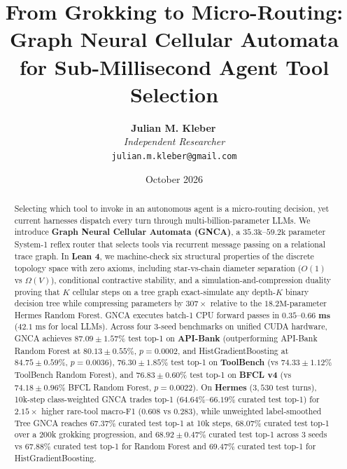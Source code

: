 \documentclass[10pt,twocolumn,letterpaper]{article}
\title{\textbf{From Grokking to Micro-Routing: Graph Neural Cellular Automata for Sub-Millisecond Agent Tool Selection}}
\author{%
  \textbf{Julian M. Kleber}\,\orcidlink{0000-0001-5518-0932} \\
  \textit{Independent Researcher} \\
  \texttt{julian.m.kleber@gmail.com}
}
\date{October 2026}
\begin{document}
\maketitle

\begin{abstract}
Selecting which tool to invoke in an autonomous agent is a micro-routing decision, yet current harnesses dispatch every turn through multi-billion-parameter LLMs. We introduce \textbf{Graph Neural Cellular Automata (GNCA)}, a $35.3\text{k}$--$59.2\text{k}$ parameter System-1 reflex router that selects tools via recurrent message passing on a relational trace graph. In \textbf{Lean 4}, we machine-check six structural properties of the discrete topology space with zero axioms, including star-vs-chain diameter separation ($O(1)$ vs $\Omega(V)$), conditional contractive stability, and a simulation-and-compression duality proving that $K$ cellular steps on a tree graph exact-simulate any depth-$K$ binary decision tree while compressing parameters by $307\times$ relative to the $18.2\text{M}$-parameter Hermes Random Forest. GNCA executes batch-1 CPU forward passes in $\mathbf{0.35}$--$\mathbf{0.66\text{ ms}}$ ($42.1\text{ ms}$ for local LLMs). Across four 3-seed benchmarks on unified CUDA hardware, GNCA achieves $\mathbf{87.09 \pm 1.57\%}$ test top-1 on \textbf{API-Bank} (outperforming API-Bank Random Forest at $80.13 \pm 0.55\%$, $p = 0.0002$, and HistGradientBoosting at $84.75 \pm 0.59\%$, $p = 0.0036$), $\mathbf{76.30 \pm 1.85\%}$ test top-1 on \textbf{ToolBench} (vs $74.33 \pm 1.12\%$ ToolBench Random Forest), and $\mathbf{76.83 \pm 0.60\%}$ test top-1 on \textbf{BFCL v4} (vs $74.18 \pm 0.96\%$ BFCL Random Forest, $p = 0.0022$). On \textbf{Hermes} ($3{,}530$ test turns), 10k-step class-weighted GNCA trades top-1 ($64.64\%$--$66.19\%$ curated test top-1) for $2.15\times$ higher rare-tool macro-F1 ($0.608$ vs $0.283$), while unweighted label-smoothed Tree GNCA reaches $67.37\%$ curated test top-1 at 10k steps, $68.07\%$ curated test top-1 over a 200k grokking progression, and $\mathbf{68.92 \pm 0.47\%}$ curated test top-1 across 3 seeds vs $67.88\%$ curated test top-1 for Random Forest and $69.47\%$ curated test top-1 for HistGradientBoosting.
\end{abstract}
\end{document}
